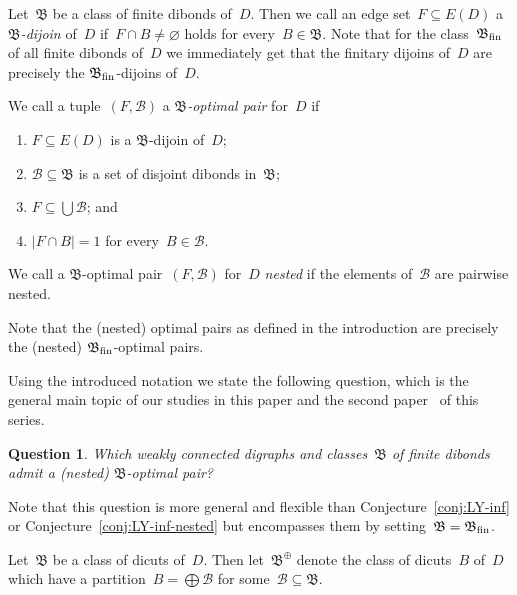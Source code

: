 \documentclass[reqno, 12pt]{amsart}
\numberwithin{equation}{section}
\numberwithin{figure}{section}
\let\emptyset=\varnothing
\theoremstyle{plain}
\newtheorem{question}[thm]{Question}
\theoremstyle{definition}
\newcommand{\abs}[1]{\ensuremath{{\lvert {#1} \rvert}}}
\begin{document}
Let~$\mathfrak{B}$ be a 
class of finite dibonds of~$D$. 
Then we call an edge set~${F \subseteq E(D)}$ a \emph{$\mathfrak{B}$-dijoin} of~$D$ 
if~${F \cap B \neq \emptyset}$ holds for every~${B \in \mathfrak{B}}$. 
Note that for the class~${\mathfrak{B}_{\textnormal{fin}}}$ of all finite dibonds of~$D$ we immediately get that the finitary dijoins of~$D$ are precisely the ${\mathfrak{B}_{\textnormal{fin}}}$-dijoins of~$D$. 

We call a tuple~${(F,\mathcal{B})}$ a \emph{$\mathfrak{B}$-optimal pair} for~$D$ if 
\begin{enumerate}[label=(\roman*)]
    \item ${F \subseteq E(D)}$ is a $\mathfrak{B}$-dijoin of~$D$;
    \item ${\mathcal{B} \subseteq \mathfrak{B}}$ is a set of disjoint dibonds in~$\mathfrak{B}$;
    \item ${F \subseteq \bigcup \mathcal{B}}$; and
    \item ${\abs{F \cap B} = 1}$ for every~${B \in \mathcal{B}}$.
\end{enumerate}

We call a $\mathfrak{B}$-optimal pair~${(F,\mathcal{B})}$ for~$D$ \emph{nested} if the elements of~$\mathcal{B}$ are pairwise nested.

Note that the (nested) optimal pairs as defined in the introduction are precisely the (nested) $\mathfrak{B}_\textnormal{fin}$-optimal pairs.


Using the introduced notation we state the following question, which is the general main topic of our studies in this paper and the second paper~\cite{inf-LY:2} of this series.


\begin{question}
    \label{q:general-LY}
    Which weakly connected digraphs and classes~$\mathfrak{B}$ of finite dibonds admit a (nested) $\mathfrak{B}$-optimal pair?
\end{question}



\noindent Note that this question is more general and flexible than Conjecture~\ref{conj:LY-inf} or Conjecture~\ref{conj:LY-inf-nested} but encompasses them by setting~${\mathfrak{B} = \mathfrak{B}_{\textnormal{fin}}}$.

\vspace{0.2cm}

Let~$\mathfrak{B}$ be a class of dicuts of~$D$. 
Then let~$\mathfrak{B}^\oplus$ denote the class of dicuts~$B$ of~$D$ 
which have a partition~${B = \bigoplus \mathcal{B}}$ for some~${\mathcal{B} \subseteq \mathfrak{B}}$. 
\end{document}
